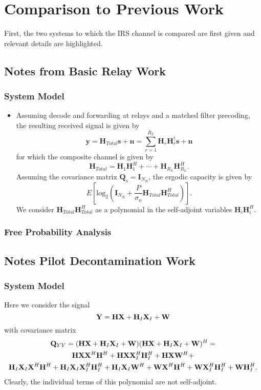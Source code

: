 \documentclass[12pt,a4paper]{report}
\begin{document}
\chapter{Comparison to Previous Work}
First, the two systems to which the IRS channel is compared are first given and relevant details are highlighted. 
\section{Notes from Basic Relay Work}
\subsection{System Model}

\begin{itemize}
\item Assuming decode and forwarding at relays and a matched filter precoding, the resulting received signal is given by 
\begin{equation}
\mathbf{y} = \mathbf{H}_{Total} \mathbf{s} +  \mathbf{n} = \sum_{r=1}^{R_L} \mathbf{H}_{r}\mathbf{H}_{r}^{\dagger}\mathbf{s} +  \mathbf{n}
\end{equation}
for which the composite channel is given by 
\begin{equation}
\mathbf{H}_{Total} = \mathbf{H}_{1}\mathbf{H}_{1}^{H} +\cdots +\mathbf{H}_{R_L}\mathbf{H}_{R_L}^{H}.
\end{equation}
Assuming the covariance matrix $\mathbf{Q}_s = \mathbf{I}_{N_R}$, the ergodic capacity is given by 
\begin{equation}\label{ergodic_capacity}
E\left[\text{log}_2(\mathbf{I}_{N_R} + \frac{P}{\sigma_n}\mathbf{H}_{Total}\mathbf{H}_{Total}^H)\right].
\end{equation}
We consider $\mathbf{H}_{Total}\mathbf{H}_{Total}^H$ as a polynomial in the self-adjoint variables $\mathbf{H}_{i}\mathbf{H}_{i}^{H}$.
\end{itemize}
\subsection{Free Probability Analysis}



\section{Notes Pilot Decontamination Work}
\subsection{System Model}
Here we consider the signal 
\begin{equation}
\mathbf{Y} = \mathbf{H}\mathbf{X} + \mathbf{H}_I \mathbf{X}_I + \mathbf{W}
\end{equation}
with covariance matrix 
\begin{gather*}
\mathbf{Q}_{YY} = (\mathbf{H}\mathbf{X} + \mathbf{H}_I \mathbf{X}_I + \mathbf{W})(\mathbf{H}\mathbf{X} + \mathbf{H}_I \mathbf{X}_I + \mathbf{W})^H = 
\\
\mathbf{H}\mathbf{X}\mathbf{X}^H\mathbf{H}^H + \mathbf{H}\mathbf{X}\mathbf{X}_I^H\mathbf{H}_I^H + \mathbf{H}\mathbf{X}\mathbf{W}^H +\\ \mathbf{H}_I \mathbf{X}_I \mathbf{X}^H\mathbf{H}^H + \mathbf{H}_I \mathbf{X}_I\mathbf{X}_I^H\mathbf{H}_I^H + \mathbf{H}_I \mathbf{X}_I\mathbf{W}^H + \mathbf{W}\mathbf{X}^H\mathbf{H}^H + \mathbf{W}\mathbf{X}_I^H\mathbf{H}_I^H + \mathbf{W}\mathbf{H}_I^H.
\end{gather*}
Clearly, the individual terms of this polynomial are not self-adjoint.
\end{document}
